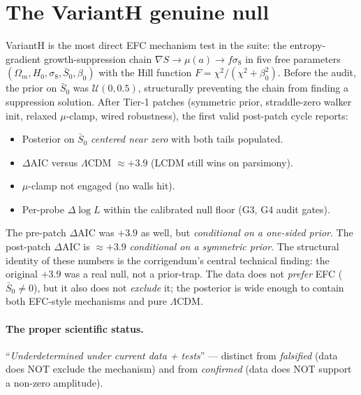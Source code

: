 \documentclass[11pt]{article}
\begin{document}
\section{The VariantH genuine null}
\label{sec:varianth}

VariantH is the most direct EFC mechanism test in the suite: the
entropy-gradient growth-suppression chain
$\nabla S \to \mu(a) \to f\sigma_8$ in five free parameters
$(\Omega_m, H_0, \sigma_8, \bar{S}_0, \beta_0)$ with the Hill function
$F = \chi^2/(\chi^2 + \beta_0^2)$. Before the audit, the prior on
$\bar{S}_0$ was $\mathcal{U}(0, 0.5)$, structurally preventing the chain
from finding a suppression solution. After Tier-1 patches (symmetric
prior, straddle-zero walker init, relaxed $\mu$-clamp, wired
robustness), the first valid post-patch cycle reports:

\begin{itemize}[leftmargin=*]
\item Posterior on $\bar{S}_0$ \emph{centered near zero} with both tails populated.
\item $\Delta$AIC versus $\Lambda$CDM $\approx +3.9$ (LCDM still wins on parsimony).
\item $\mu$-clamp not engaged (no walls hit).
\item Per-probe $\Delta\log L$ within the calibrated null floor (G3, G4 audit gates).
\end{itemize}

The pre-patch $\Delta$AIC was $+3.9$ as well, but \emph{conditional on a
one-sided prior}. The post-patch $\Delta$AIC is $\approx +3.9$
\emph{conditional on a symmetric prior}. The structural identity of these
numbers is the corrigendum's central technical finding: the original
$+3.9$ was a real null, not a prior-trap. The data does not
\emph{prefer} EFC ($\bar{S}_0\ne 0$), but it also does not
\emph{exclude} it; the posterior is wide enough to contain both
EFC-style mechanisms and pure $\Lambda$CDM.

\paragraph{The proper scientific status.} ``\emph{Underdetermined under
current data + tests}'' --- distinct from \emph{falsified} (data does NOT
exclude the mechanism) and from \emph{confirmed} (data does NOT support a
non-zero amplitude).

\end{document}
